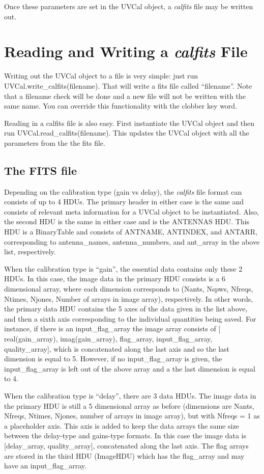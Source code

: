\documentclass[11pt, oneside]{article}   	%
\begin{document}
Once these parameters are set in the UVCal object, a \textit{calfits} file may
be written out.

\section{Reading and Writing a \textit{calfits} File}
Writing out the UVCal object to a file is very simple: just run
UVCal.write\_calfits(filename). That will write a fits file called
``filename''. Note that a filename check will be done and a new file will not be
written with the same name. You can override this functionality with the clobber
key word.

Reading in a calfits file is also easy. First instantiate the UVCal object and
then run UVCal.read\_calfits(filename). This updates the UVCal object with all
the parameters from the the fits file.

\subsection{The FITS file}
Depending on the calibration type (gain vs delay), the \textit{calfits} file
format can consists of up to 4 HDUs. The primary header in either case is the
same and consists of relevant meta information for a UVCal object to be
instantiated. Also, the second HDU is the same in either case and is the ANTENNAS
HDU. This HDU is a BinaryTable and consists of ANTNAME, ANTINDEX, and ANTARR,
corresponding to antenna\_names, antenna\_numbers, and ant\_array in the above
list, respectively.

When the calibration type is ``gain'', the essential data contains only these 2
HDUs. In this case, the image data in the primary HDU consists is a 6
dimensional array, where each dimension corresponds to (Nants, Nspws, Nfreqs,
Ntimes, Njones, Number of arrays in image array), respectively. In other words,
the primary data HDU contains the 5 axes of the data given in the list above,
and then a sixth axis corresponding to the individual quantities being
saved. For instance, if there is an input\_flag\_array the image array consists
of [ real(gain\_array), imag(gain\_array), flag\_array, input\_flag\_array,
quality\_array], which is concatenated along the last axis and so the last
dimension is equal to 5. However, if no input\_flag\_array is given, the
input\_flag\_array is left out of the above array and a the last dimension is
equal to 4.

When the calibration type is ``delay'', there are 3 data HDUs. The image data in
the primary HDU is still a 5 dimensional array as before (dimensions are Nants,
Nfreqs, Ntimes, Njones, number of arrays in image array), but with Nfreqs = 1 as
a placeholder axis. This axis is added to keep the data arrays the same size
between the delay-type and gains-type formats. In this case the image data is
[delay\_array, quality\_array], concatenated along the last axis. The flag
arrays are stored in the third HDU (ImageHDU) which has the flag\_array and may
have an input\_flag\_array.
\end{document}
